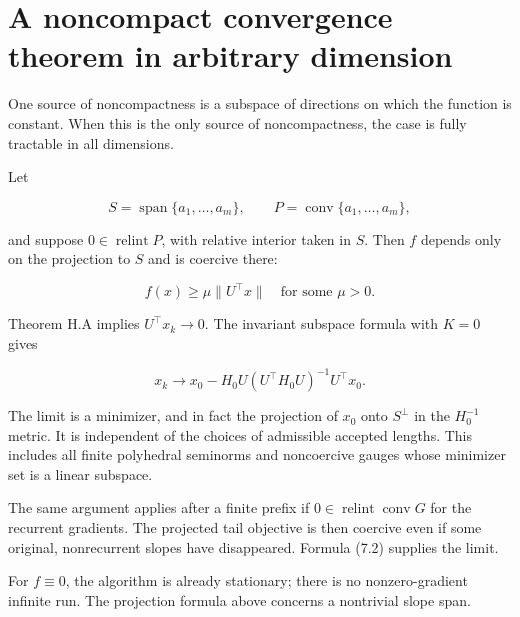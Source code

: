 \setcounter{section}{7}
\setcounter{theorem}{0}
\setcounter{lemma}{0}
\setcounter{corollary}{0}
\setcounter{proposition}{0}
\setcounter{remark}{0}
\setcounter{equation}{0}
\section{A noncompact convergence theorem in arbitrary
dimension}\label{H:a-noncompact-convergence-theorem-in-arbitrary-dimension}

One source of noncompactness is a subspace of directions on which the
function is constant. When this is the only source of noncompactness,
the case is fully tractable in all dimensions.

Let

\[
S=\operatorname{span}\{a_1,\ldots,a_m\},\qquad
P=\operatorname{conv}\{a_1,\ldots,a_m\},
\]

and suppose \(0\in\operatorname{relint}P\), with relative interior taken
in \(S\). Then \(f\) depends only on the projection to \(S\) and is
coercive there:

\[
f(x)\ge\mu\|U^\top x\|\quad\text{for some }\mu>0.
\]

Theorem H.A implies \(U^\top x_k\to0\). The invariant subspace formula
with \(K=0\) gives

\[
\boxed{
x_k\longrightarrow
x_0-H_0U(U^\top H_0U)^{-1}U^\top x_0.
}
\tag{H.8.1}
\]

The limit is a minimizer, and in fact the projection of \(x_0\) onto
\(S^\perp\) in the \(H_0^{-1}\) metric. It is independent of the choices
of admissible accepted lengths. This includes all finite polyhedral
seminorms and noncoercive gauges whose minimizer set is a linear
subspace.

The same argument applies after a finite prefix if
\(0\in\operatorname{relint}\operatorname{conv}G\) for the recurrent
gradients. The projected tail objective is then coercive even if some
original, nonrecurrent slopes have disappeared. Formula (7.2) supplies
the limit.

For \(f\equiv0\), the algorithm is already stationary; there is no
nonzero-gradient infinite run. The projection formula above concerns a
nontrivial slope span.


\endgroup
